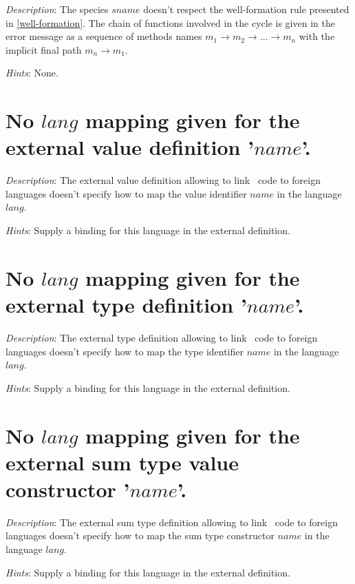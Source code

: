 {\em Description}: The species $sname$ doesn't respect the
well-formation rule presented in \ref{well-formation}. The chain of
functions involved in the cycle is given in the error message as a
sequence of methods names
$m_1 \rightarrow m_2 \rightarrow \ldots \rightarrow m_n$ with the
implicit final path $m_n \rightarrow m_1$.

{\em Hints}: None.



\section*{No $lang$ mapping given for the external value definition
  '$name$'.}

{\em Description}: The external value definition allowing to link
\focal\ code to foreign languages doesn't specify how to map the value
identifier $name$ in the language $lang$.

{\em Hints}: Supply a binding for this language in the external
definition.



\section*{No $lang$ mapping given for the external type definition
  '$name$'.}

{\em Description}: The external type definition allowing to link
\focal\ code to foreign languages doesn't specify how to map the type
identifier $name$ in the language $lang$.

{\em Hints}: Supply a binding for this language in the external
definition.



\section*{No $lang$ mapping given for the external sum type value
  constructor '$name$'.}

{\em Description}: The external sum type definition allowing to link
\focal\ code to foreign languages doesn't specify how to map the sum
type constructor $name$ in the language $lang$.

{\em Hints}: Supply a binding for this language in the external
definition.




